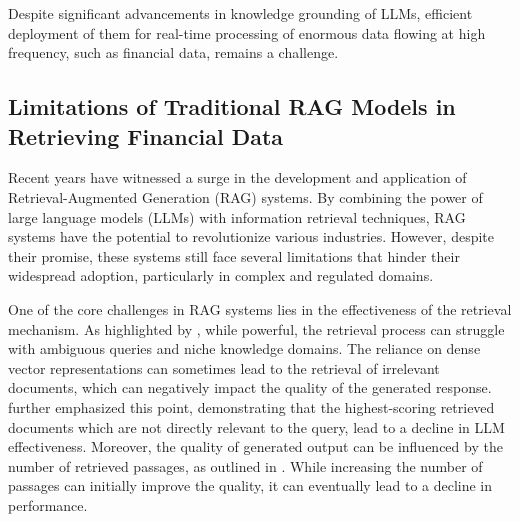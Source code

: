 Despite significant advancements in knowledge grounding of LLMs, efficient deployment of them for real-time processing of enormous data flowing at high frequency, such as financial data, remains a challenge. 

\subsection{Limitations of Traditional RAG Models in Retrieving Financial Data}
Recent years have witnessed a surge in the development and application of Retrieval-Augmented Generation (RAG) systems. By combining the power of large language models (LLMs) with information retrieval techniques, RAG systems have the potential to revolutionize various industries. However, despite their promise, these systems still face several limitations that hinder their widespread adoption, particularly in complex and regulated domains. 

One of the core challenges in RAG systems lies in the effectiveness of the retrieval mechanism. As highlighted by \cite{gupta2024comprehensive}, while powerful, the retrieval process can struggle with ambiguous queries and niche knowledge domains. The reliance on dense vector representations can sometimes lead to the retrieval of irrelevant documents, which can negatively impact the quality of the generated response. \cite{cuconasu2024power} further emphasized this point, demonstrating that the highest-scoring retrieved documents which are not directly relevant to the query, lead to a decline in LLM effectiveness. Moreover, the quality of generated output can be influenced by the number of retrieved passages, as outlined in \cite{jin2024long}. While increasing the number of passages can initially improve the quality, it can eventually lead to a decline in performance.

